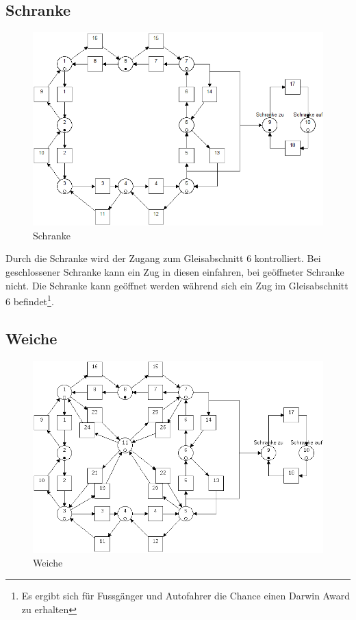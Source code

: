 \documentclass[10pt]{scrartcl}
\begin{document}
	\subsection{Schranke}	
		\begin{figure}[H]
			\includegraphics[width=\textwidth]{aufgabe21.png}
        	\caption{Schranke}
        	\label{img:aufg2}
		\end{figure}
	Durch die Schranke wird der Zugang zum Gleisabschnitt 6 kontrolliert. Bei geschlossener Schranke kann ein Zug in diesen einfahren, bei geöffneter Schranke nicht. Die Schranke kann geöffnet werden während sich ein Zug im Gleisabschnitt 6 befindet\footnote{Es ergibt sich für Fussgänger und Autofahrer die Chance einen Darwin Award zu erhalten}.	
	

\subsection{Weiche}	
	\begin{figure}[H]
		\includegraphics[width=\textwidth]{aufgabe22.png}
       	\caption{Weiche}
       	\label{img:aufg2}
	\end{figure}
	
\end{document}
